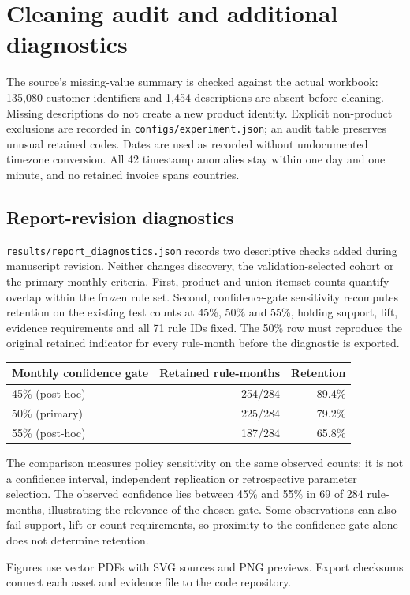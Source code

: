 \section{Cleaning audit and additional diagnostics}
\label{app:audit}
\begin{table}[!htbp]
\centering\small

\caption{Sequential cleaning across all countries. Each removed record is counted only at its first exclusion; removals reconcile exactly with the retained total.}
\label{tab:cleaning}
\end{table}

The source's missing-value summary is checked against the actual workbook: 135,080 customer identifiers and 1,454 descriptions are absent before cleaning. Missing descriptions do not create a new product identity. Explicit non-product exclusions are recorded in \texttt{configs/experiment.json}; an audit table preserves unusual retained codes. Dates are used as recorded without undocumented timezone conversion. All 42 timestamp anomalies stay within one day and one minute, and no retained invoice spans countries.

\subsection*{Report-revision diagnostics}
\texttt{results/report\_diagnostics.json} records two descriptive checks added during manuscript revision. Neither changes discovery, the validation-selected cohort or the primary monthly criteria. First, product and union-itemset counts quantify overlap within the frozen rule set. Second, confidence-gate sensitivity recomputes retention on the existing test counts at 45\%, 50\% and 55\%, holding support, lift, evidence requirements and all 71 rule IDs fixed. The 50\% row must reproduce the original retained indicator for every rule-month before the diagnostic is exported.

\begin{center}
\begin{tabular}{lrr}
\toprule
Monthly confidence gate & Retained rule-months & Retention\\
\midrule
45\% (post-hoc) & 254/284 & 89.4\%\\
50\% (primary) & 225/284 & 79.2\%\\
55\% (post-hoc) & 187/284 & 65.8\%\\
\bottomrule
\end{tabular}
\end{center}
The comparison measures policy sensitivity on the same observed counts; it is not a confidence interval, independent replication or retrospective parameter selection. The observed confidence lies between 45\% and 55\% in 69 of 284 rule-months, illustrating the relevance of the chosen gate. Some observations can also fail support, lift or count requirements, so proximity to the confidence gate alone does not determine retention.

Figures use vector PDFs with SVG sources and PNG previews. Export checksums connect each asset and evidence file to the code repository.
